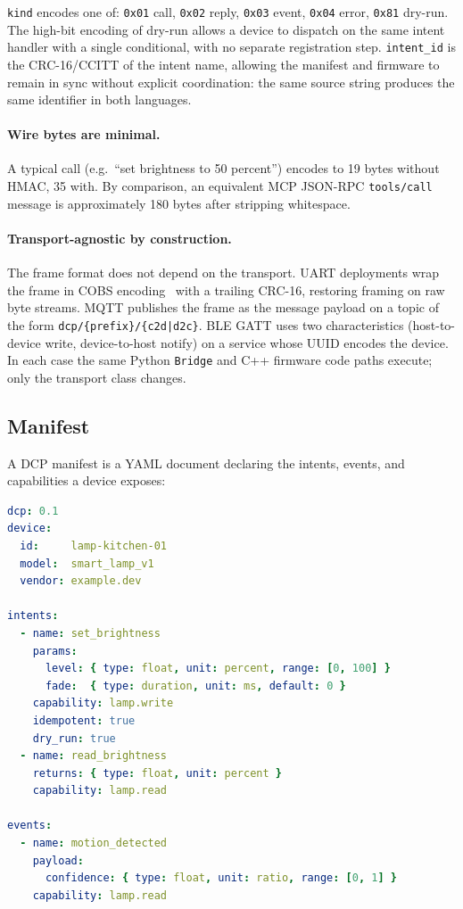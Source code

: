 \documentclass[11pt,a4paper]{article}
\begin{document}
\noindent
\texttt{kind} encodes one of: \texttt{0x01} call, \texttt{0x02} reply,
\texttt{0x03} event, \texttt{0x04} error, \texttt{0x81} dry-run. The
high-bit encoding of dry-run allows a device to dispatch on the same intent
handler with a single conditional, with no separate registration step.
\texttt{intent\_id} is the CRC-16/CCITT of the intent name, allowing the
manifest and firmware to remain in sync without explicit coordination:
the same source string produces the same identifier in both languages.

\paragraph{Wire bytes are minimal.} A typical call (e.g.\ ``set brightness
to 50 percent'') encodes to 19 bytes without HMAC, 35 with. By comparison,
an equivalent MCP JSON-RPC \texttt{tools/call} message is approximately
180 bytes after stripping whitespace.

\paragraph{Transport-agnostic by construction.} The frame format does
not depend on the transport. UART deployments wrap the frame in COBS
encoding~\cite{cobs1999} with a trailing CRC-16, restoring framing on raw
byte streams. MQTT publishes the frame as the message payload on a topic
of the form \texttt{dcp/\{prefix\}/\{c2d|d2c\}}. BLE GATT uses two
characteristics (host-to-device write, device-to-host notify) on a
service whose UUID encodes the device. In each case the same Python
\texttt{Bridge} and C++ firmware code paths execute; only the transport
class changes.

\subsection{Manifest}

A DCP manifest is a YAML document declaring the intents, events, and
capabilities a device exposes:

\begin{lstlisting}[language=yaml]
dcp: 0.1
device:
  id:     lamp-kitchen-01
  model:  smart_lamp_v1
  vendor: example.dev

intents:
  - name: set_brightness
    params:
      level: { type: float, unit: percent, range: [0, 100] }
      fade:  { type: duration, unit: ms, default: 0 }
    capability: lamp.write
    idempotent: true
    dry_run: true
  - name: read_brightness
    returns: { type: float, unit: percent }
    capability: lamp.read

events:
  - name: motion_detected
    payload:
      confidence: { type: float, unit: ratio, range: [0, 1] }
    capability: lamp.read
\end{lstlisting}
\end{document}
